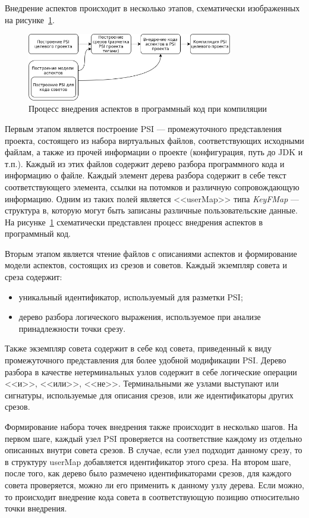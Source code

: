 \documentclass[conference]{IEEEtran}
\begin{document}
Внедрение аспектов происходит в несколько этапов, схематически изображенных на
рисунке~\ref{fig:aspect_weaving}.
\begin{figure}[!t]
\centering
\includegraphics[width=0.8\textwidth]{aspect_weaving}
\caption{Процесс внедрения аспектов в программный код при компиляции}
\label{fig:aspect_weaving}
\end{figure}

Первым этапом является построение PSI --- промежуточного представления проекта, 
состоящего из набора виртуальных файлов, соответствующих исходными файлам, а 
также из прочей информации о проекте (конфигурация, путь до JDK и т.п.).
Каждый из этих файлов содержит дерево разбора программного кода и информацию о
файле.
Каждый элемент дерева разбора содержит в себе текст соответствующего элемента,
ссылки на потомков и различную сопровождающую информацию.
Одним из таких полей является <<userMap>> типа \textit{KeyFMap} --- структура в,
которую могут быть записаны различные пользовательские данные.
На рисунке~\ref{fig:aspect_weaving} схематически представлен процесс внедрения
аспектов в программный код.

Вторым этапом является чтение файлов с описаниями аспектов и формирование
модели аспектов, состоящих из срезов и советов.
Каждый экземпляр совета и среза содержит:
\begin{itemize}
	\item уникальный идентификатор, используемый для разметки PSI;
	\item дерево разбора логического выражения, используемое при анализе
		  принадлежности точки срезу.
\end{itemize}
Также экземпляр совета содержит в себе код совета, приведенный к виду
промежуточного представления для более удобной модификации PSI.
Дерево разбора в качестве нетерминальных узлов содержит в себе логические
операции <<и>>, <<или>>, <<не>>.
Терминальными же узлами выступают или сигнатуры, используемые для описания
срезов, или же идентификаторы других срезов.

Формирование набора точек внедрения также происходит в несколько шагов.
На первом шаге, каждый узел PSI проверяется на соответствие каждому из отдельно
описанных внутри совета срезов.
В случае, если узел подходит данному срезу, то в структуру userMap добавляется
идентификатор этого среза.
На втором шаге, после того, как дерево было размечено идентификаторами срезов, 
для каждого совета проверяется, можно ли его применить к данному узлу дерева.
Если можно, то происходит внедрение кода совета в соответствующую позицию
относительно точки внедрения.
\end{document}
